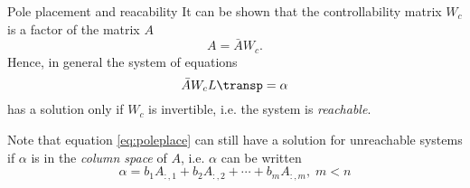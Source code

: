 \documentclass[presentation,aspectratio=1610]{beamer}
\begin{document}
\begin{frame}[label={sec:orgb2fe1da}]{Pole placement and reacability}
It can be shown that the controllability matrix \(W_c\) is a factor of the matrix \(A\)
\[ A = \bar{A} W_c. \] Hence, in general the system of equations
\begin{equation}
\bar{A}W_c L\transp = \alpha
\label{eq:poleplace}
\end{equation}
has a solution only if \(W_c\) is invertible, i.e. the system is \emph{reachable}.

Note that equation \eqref{eq:poleplace} can still have a solution for unreachable systems if \alert{\(\alpha\) is in the \emph{column space} of \(A\)}, i.e. \(\alpha\) can be written
\[ \alpha = b_1 A_{:,1} + b_2A_{:,2} + \cdots + b_mA_{:,m}, \; m < n \]
\end{frame}
\end{document}
